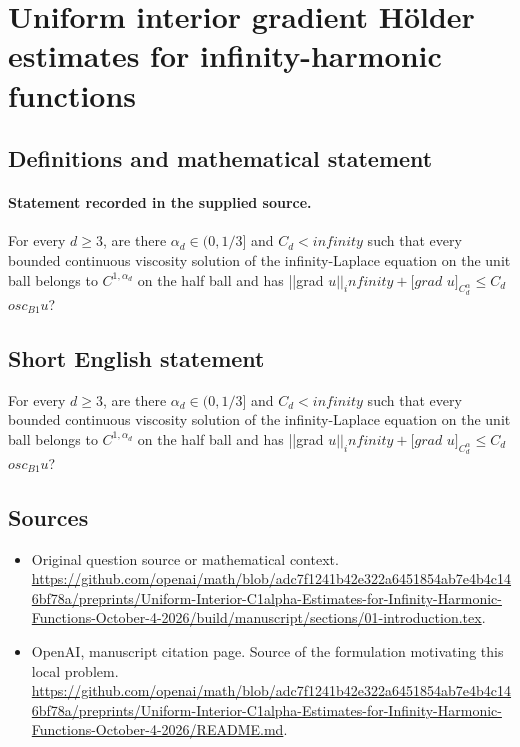 \documentclass[11pt]{article}
\begin{document}
\section*{Uniform interior gradient Hölder estimates for infinity-harmonic functions}\label{statement}
\subsection{Definitions and mathematical statement}
\paragraph{Statement recorded in the supplied source.}
For every $d\geq 3$, are there $\alpha _d\in (0,1/3]$ and $C_d<infinity$ such that every bounded continuous viscosity solution of the infinity-Laplace equation on the unit ball belongs to $C^{1,\alpha _d}$ on the half ball and has ||grad $u||_infinity+[grad$ $u]_{C^\alpha _d}\leq C_d$ $osc_{B1}u$?
\subsection{Short English statement}
For every $d\geq 3$, are there $\alpha _d\in (0,1/3]$ and $C_d<infinity$ such that every bounded continuous viscosity solution of the infinity-Laplace equation on the unit ball belongs to $C^{1,\alpha _d}$ on the half ball and has ||grad $u||_infinity+[grad$ $u]_{C^\alpha _d}\leq C_d$ $osc_{B1}u$?
\subsection{Sources}
\begin{itemize}
\item[S1] Original question source or mathematical context.
\url{https://github.com/openai/math/blob/adc7f1241b42e322a6451854ab7e4b4c146bf78a/preprints/Uniform-Interior-C1alpha-Estimates-for-Infinity-Harmonic-Functions-October-4-2026/build/manuscript/sections/01-introduction.tex}.
\item[S2] OpenAI, manuscript citation page. Source of the formulation motivating this local problem.
\url{https://github.com/openai/math/blob/adc7f1241b42e322a6451854ab7e4b4c146bf78a/preprints/Uniform-Interior-C1alpha-Estimates-for-Infinity-Harmonic-Functions-October-4-2026/README.md}.
\end{itemize}
\end{document}
